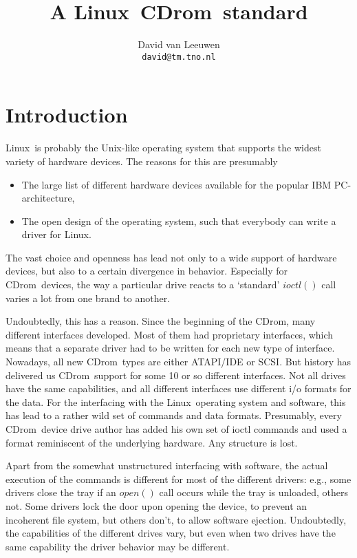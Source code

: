 \documentclass{article}
\def\linux{{\sc Linux}}
\def\cdrom{{\sc CDrom}}
\begin{document}
\title{A \linux\ \cdrom\ standard}
\author{David van Leeuwen\\{\normalsize\tt david@tm.tno.nl}}

\maketitle

\section{Introduction}

\linux\ is probably the Unix-like operating system that supports the widest
variety of hardware devices. The reasons for this are presumably
\begin{itemize}
\item The large list of different hardware devices available for the popular
IBM PC-architecture,
\item The open design of the operating system, such that everybody can
write a driver for Linux.
\end{itemize}
The vast choice and openness has lead not only to a wide support of
hardware devices, but also to a certain divergence in
behavior. Especially for \cdrom\ devices, the way a particular drive
reacts to a `standard' $ioctl()$ call varies a lot from one brand
to another. 

Undoubtedly, this has a reason. Since the beginning of the \cdrom,
many different interfaces developed. Most of them had proprietary
interfaces, which means that a separate driver had to be written for
each new type of interface. Nowadays, all new \cdrom\ types are either
ATAPI/IDE or SCSI. But history has delivered us \cdrom\ support for
some 10 or so different interfaces. Not all drives have the same
capabilities, and all different interfaces use different i/o formats
for the data. For the interfacing with the \linux\ operating system
and software, this has lead to a rather wild set of commands and data
formats. Presumably, every \cdrom\ device drive author has added his
own set of ioctl commands and used a format reminiscent of the
underlying hardware. Any structure is lost. 

Apart from the somewhat unstructured interfacing with software, the
actual execution of the commands is different for most of the
different drivers: e.g., some drivers close the tray if an $open()$ call
occurs while the tray is unloaded, others not. Some drivers lock the
door upon opening the device, to prevent an incoherent file system,
but others don't, to allow software ejection. Undoubtedly, the
capabilities of the different drives vary, but even when two drives have
the same capability the driver behavior may be different. 
\end{document}
